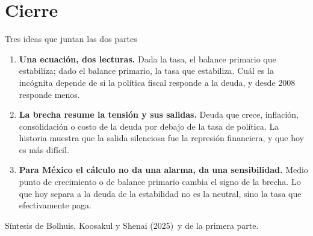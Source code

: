 \documentclass[aspectratio=169,11pt]{beamer}
\newcommand{\fuente}[1]{\par\vfill{\small\color{cGris}#1\par}}
\newcommand{\BKS}{Bolhuis, Koosakul y Shenai (2025)}
\begin{document}
\section{Cierre}

\begin{frame}{Tres ideas que juntan las dos partes}
  \begin{enumerate}
    \item<1-> \textbf{Una ecuación, dos lecturas.} Dada la tasa, el balance primario que estabiliza; dado el balance primario, la tasa que estabiliza. Cuál es la incógnita depende de si la política fiscal responde a la deuda, y desde 2008 responde menos.
    \item<2-> \textbf{La brecha resume la tensión y sus salidas.} Deuda que crece, inflación, consolidación o costo de la deuda por debajo de la tasa de política. La historia muestra que la salida silenciosa fue la represión financiera, y que hoy es más difícil.
    \item<3-> \textbf{Para México el cálculo no da una alarma, da una sensibilidad.} Medio punto de crecimiento o de balance primario cambia el signo de la brecha. Lo que hoy separa a la deuda de la estabilidad no es la neutral, sino la tasa que efectivamente paga.
  \end{enumerate}
  \fuente{Síntesis de \BKS\ y de la primera parte.}
\end{frame}
\end{document}
